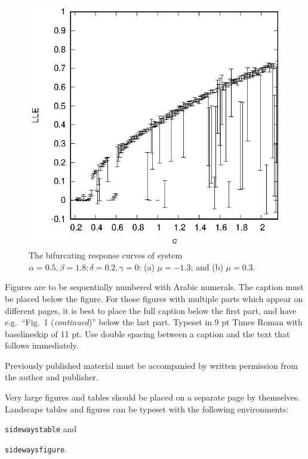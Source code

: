 \documentclass{ws-ijbc}
\begin{document}
\begin{figure}
\begin{center}
\includegraphics[width=5in]{lle.eps}
\end{center}
\caption{The bifurcating response curves of system
$\alpha=0.5, \beta=1.8; \delta=0.2, \gamma=0$: (a)
$\mu=-1.3$; and (b) $\mu=0.3$.}
\label{fig1}
\end{figure}

Figures are to be sequentially numbered with Arabic
numerals. The caption must be placed below the figure. For those
figures with multiple parts which appear on different pages, it is
best to place the full caption below the first part, and have
e.g.~``Fig.~1 ({\it continued})'' below the last part. Typeset in
9 pt Times Roman with baselineskip of 11 pt. Use double spacing
between a caption and the text that follows immediately.

Previously published material must be accompanied by written
permission from the author and publisher.

Very large figures and tables should be placed on a separate page
by themselves. Landscape tables and figures can be typeset with the following environments:
\begin{itemlist}
\item \verb|sidewaystable| and
\item \verb|sidewaysfigure|.
\end{itemlist}
\end{document}
